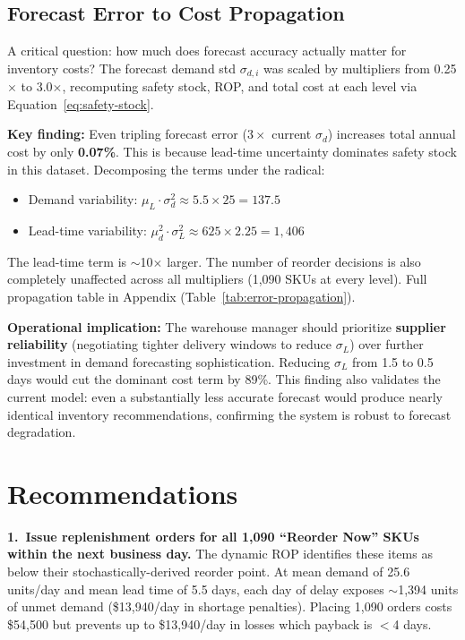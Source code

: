 \documentclass[11pt,letterpaper]{article}
\begin{document}
\subsection{Forecast Error to Cost Propagation}
\label{sec:error-propagation}

A critical question: how much does forecast accuracy actually matter for inventory costs? The forecast demand std $\sigma_{d,i}$ was scaled by multipliers from 0.25$\times$ to 3.0$\times$, recomputing safety stock, ROP, and total cost at each level via Equation~\ref{eq:safety-stock}.

\textbf{Key finding:} Even tripling forecast error ($3\times$ current $\sigma_d$) increases total annual cost by only \textbf{0.07\%}. This is because lead-time uncertainty dominates safety stock in this dataset. Decomposing the terms under the radical:
\begin{itemize}[nosep]
    \item Demand variability: $\mu_L \cdot \sigma_d^2 \approx 5.5 \times 25 = 137.5$
    \item Lead-time variability: $\mu_d^2 \cdot \sigma_L^2 \approx 625 \times 2.25 = 1{,}406$
\end{itemize}
The lead-time term is $\sim$10$\times$ larger. The number of reorder decisions is also completely unaffected across all multipliers (1,090 SKUs at every level). Full propagation table in Appendix (Table~\ref{tab:error-propagation}).

\textbf{Operational implication:} The warehouse manager should prioritize \textbf{supplier reliability} (negotiating tighter delivery windows to reduce $\sigma_L$) over further investment in demand forecasting sophistication. Reducing $\sigma_L$ from 1.5 to 0.5 days would cut the dominant cost term by 89\%. This finding also validates the current model: even a substantially less accurate forecast would produce nearly identical inventory recommendations, confirming the system is robust to forecast degradation.


\section{Recommendations}
\label{sec:recommendations}

\textbf{1.~Issue replenishment orders for all 1,090 ``Reorder Now'' SKUs within the next business day.} The dynamic ROP identifies these items as below their stochastically-derived reorder point. At mean demand of 25.6 units/day and mean lead time of 5.5 days, each day of delay exposes $\sim$1,394 units of unmet demand (\$13,940/day in shortage penalties). Placing 1,090 orders costs \$54,500 but prevents up to \$13,940/day in losses which payback is $<$4 days.
\end{document}
